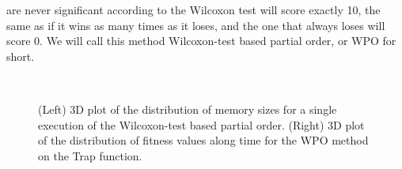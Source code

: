 \documentclass{llncs}
\begin{document}
are never significant according to the Wilcoxon test will score
exactly 10, the same as if it wins as many times as it loses, and the
one that always loses will score 0. We will call this method
Wilcoxon-test based partial order, or {\sf WPO} for short.
\begin{figure}[!t] %
\centering
{}
~
\caption{(Left) 3D plot of the distribution of memory sizes for a single
execution of the Wilcoxon-test based partial order. (Right)
3D plot of the distribution of fitness values along time for the WPO
method on the Trap function. \label{fig:initial}}
\end{figure}
\end{document}
